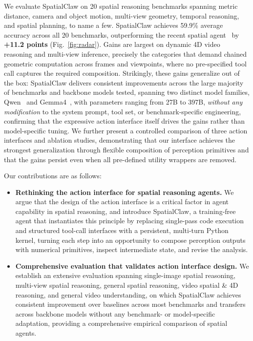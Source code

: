 \documentclass{llmxive}
\providecommand{\ours}{SpatialClaw}
\begin{document}
We evaluate \ours{} on 20 spatial reasoning benchmarks spanning metric distance, camera and object motion, multi-view geometry, temporal reasoning, and spatial planning, to name a few.
\ours{} achieves 59.9\% average accuracy across all 20 benchmarks, outperforming the recent spatial agent~\citep{chen2025spacetools} by \textbf{+11.2 points} (Fig.~\ref{fig:radar}).
Gains are largest on dynamic 4D video reasoning and multi-view inference, precisely the categories that demand chained geometric computation across frames and viewpoints, where no pre-specified tool call captures the required composition.
Strikingly, these gains generalize out of the box: \ours{} delivers consistent improvements across the large majority of benchmarks and backbone models tested, spanning two distinct model families, Qwen~\citep{qwen3.5,qwen3.6-27b,qwen36_35b_a3b} and Gemma4~\citep{gemma4}, with parameters ranging from 27B to 397B, \emph{without any modification} to the system prompt, tool set, or benchmark-specific engineering, confirming that the expressive action interface itself drives the gains rather than model-specific tuning.
We further present a controlled comparison of three action interfaces and ablation studies, demonstrating that our interface achieves the strongest generalization through flexible composition of perception primitives and that the gains persist even when all pre-defined utility wrappers are removed.

Our contributions are as follows:
\begin{itemize}[leftmargin=1.5em,itemsep=1pt,topsep=1pt]
  \item \textbf{Rethinking the action interface for spatial reasoning agents.}
    We argue that the design of the action interface is a critical factor in agent capability in spatial reasoning, and introduce \ours{}, a training-free agent that instantiates this principle by replacing single-pass code execution and structured tool-call interfaces with a persistent, multi-turn Python kernel, turning each step into an opportunity to compose perception outputs with numerical primitives, inspect intermediate state, and revise the analysis.
  \item \textbf{Comprehensive evaluation that validates action interface design.}
    We establish an extensive evaluation spanning single-image spatial reasoning, multi-view spatial reasoning, general spatial reasoning, video spatial \& 4D reasoning, and general video understanding, on which \ours{} achieves consistent improvement over baselines across most benchmarks and transfers across backbone models without any benchmark- or model-specific adaptation, providing a comprehensive empirical comparison of spatial agents.
\end{itemize}
\end{document}
